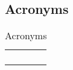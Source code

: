 \subsection{Acronyms}

\begin{center}
\renewcommand{\arraystretch}{2}
\begin{longtable}{|m{3cm}|m{7.1cm}|}
\caption{Acronyms}\\
\hline
\endfirsthead
\endhead
\hline
\endlastfoot
\hline
& \\
& \\
& \\
& \\
\hline
\end{longtable}
\end{center}
